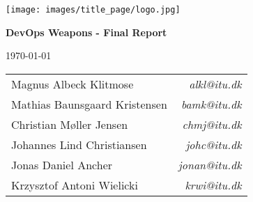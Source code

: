 \begin{titlepage}
    \centering
    \texttt{[image: images/title\_page/logo.jpg]}\\
    \vspace*{\fill}
    {\LARGE \textbf{DevOps Weapons - Final Report} \par}
    \vspace{1cm}
    {\large \today \par}
    \vspace{1cm}
        \begin{table}[h!]
        \centering
        \begin{tabular}{lr}
        Magnus Albeck Klitmose        & \textit{alkl@itu.dk}  \\
        Mathias Baunsgaard Kristensen & \textit{bamk@itu.dk}  \\
        Christian Møller Jensen       & \textit{chmj@itu.dk}  \\
        Johannes Lind Christiansen    & \textit{johc@itu.dk}  \\
        Jonas Daniel Ancher           & \textit{jonan@itu.dk} \\
        Krzysztof Antoni Wielicki     & \textit{krwi@itu.dk}
        \end{tabular}
        \label{tab:frontpage}
        \end{table}    
    \vspace*{\fill}
\end{titlepage}
